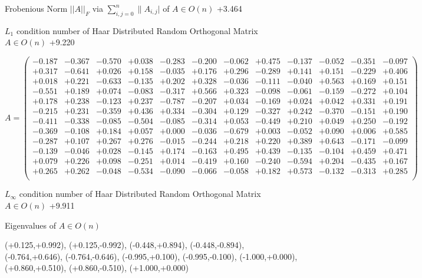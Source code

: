 \documentclass[9pt]{article}
\theoremstyle{plain}
\theoremstyle{definition}
\theoremstyle{remark}
\numberwithin{equation}{section}
\begin{document}
Frobenious Norm  $||A||_{\textit{F}}$ via $\sum\limits_{i,j =0}^{n} \|A_{i,j}|$   of  $A \in O(n)$  +3.464

$L_1$ condition number of Haar Distributed Random Orthogonal Matrix $A \in O(n)$ +9.220

$A = \left(
\begin{array}{
cccccccccccc}
-0.187 & -0.367 & -0.570 & +0.038 & -0.283 & -0.200 & -0.062 & +0.475 & -0.137 & -0.052 & -0.351 & -0.097 \\
+0.317 & -0.641 & +0.026 & +0.158 & -0.035 & +0.176 & +0.296 & -0.289 & +0.141 & +0.151 & -0.229 & +0.406 \\
+0.018 & +0.221 & -0.633 & -0.135 & +0.202 & +0.328 & -0.036 & -0.111 & -0.040 & +0.563 & +0.169 & +0.151 \\
-0.551 & +0.189 & +0.074 & -0.083 & -0.317 & +0.566 & +0.323 & -0.098 & -0.061 & -0.159 & -0.272 & +0.104 \\
+0.178 & +0.238 & -0.123 & +0.237 & -0.787 & -0.207 & +0.034 & -0.169 & +0.024 & +0.042 & +0.331 & +0.191 \\
-0.215 & +0.231 & -0.359 & +0.436 & +0.334 & -0.304 & +0.129 & -0.327 & +0.242 & -0.370 & -0.151 & +0.190 \\
-0.411 & -0.338 & -0.085 & -0.504 & -0.085 & -0.314 & +0.053 & -0.449 & +0.210 & +0.049 & +0.250 & -0.192 \\
-0.369 & -0.108 & +0.184 & +0.057 & +0.000 & -0.036 & -0.679 & +0.003 & -0.052 & +0.090 & +0.006 & +0.585 \\
-0.287 & +0.107 & +0.267 & +0.276 & -0.015 & -0.244 & +0.218 & +0.220 & +0.389 & +0.643 & -0.171 & -0.099 \\
-0.139 & -0.046 & +0.028 & -0.145 & +0.174 & -0.163 & +0.495 & +0.439 & -0.135 & -0.104 & +0.459 & +0.471 \\
+0.079 & +0.226 & +0.098 & -0.251 & +0.014 & -0.419 & +0.160 & -0.240 & -0.594 & +0.204 & -0.435 & +0.167 \\
+0.265 & +0.262 & -0.048 & -0.534 & -0.090 & -0.066 & -0.058 & +0.182 & +0.573 & -0.132 & -0.313 & +0.285 \\
\end{array}
\right)$ \newline 

$L_{\infty}$ condition number of Haar Distributed Random Orthogonal Matrix $A \in O(n)$ +9.911

Eigenvalues of $A \in O(n)$

(+0.125,+0.992), (+0.125,-0.992), (-0.448,+0.894), (-0.448,-0.894), (-0.764,+0.646), (-0.764,-0.646), (-0.995,+0.100), (-0.995,-0.100), (-1.000,+0.000), (+0.860,+0.510), (+0.860,-0.510), (+1.000,+0.000)
\end{document}
